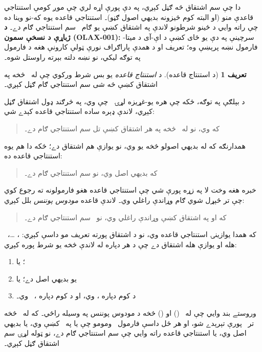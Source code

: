 \documentclass[12pt,a4paper,oneside]{report}
\theoremstyle{definition}
\newtheorem{defn}[thm]{تعريف}
\begin{document}
\label{olpseg:OLP-0113-B008:start}
دا چې سم اشتقاق څه ګڼل کېږي، په دې پورې اړه لري چې موږ
کومې استنتاجي قاعدې منو (او البته کوم څيزونه بديهي اصول ګڼو)۔
استنتاجي قاعده يوه که-نو وينا ده چې راته وايي د ځينو شرطونو لاندې
په اشتقاق کښې يو ګام~ سم استنتاجي ګام دے۔
\textbf{د ژباړې د نسخې سمون (OLAX-001):} سرچينې په دې يو ځای کښې
د اې-آی د ميتا-فارمول نښه پرېښې وه؛ تعريف او د همدې پاراګراف نورې
ټولې کارونې هغه د فارمول په توګه ليکي، نو نښه دلته بېرته راوستل شوه۔
\label{olpseg:OLP-0113-B008:end}

\label{olpseg:OLP-0113-B009:start}
\begin{defn}[د استنتاج قاعده]
د \emph{استنتاج قاعده} يو بس شرط ورکوي چې له~\LR{$\Gamma$} څخه په
اشتقاق کښې څه شی سم استنتاجي ګام ګڼل کېږي۔
\end{defn}
\label{olpseg:OLP-0113-B009:end}

\label{olpseg:OLP-0113-B010:start}
د بېلګې په توګه، ځکه چې هره يو-غړيزه لړۍ~ چې
 وي، په څرګند ډول اشتقاق ګڼل کېږي، لاندې
ډېره ساده استنتاجي قاعده کېدے شي:
\begin{quote}
  که  وي، نو  له~\LR{$\Gamma$} څخه په هر
  اشتقاق کښې تل سم استنتاجي ګام دے۔
\end{quote}
همدارنګه که  له بديهي اصولو څخه يو وي، نو يوازې  هم
اشتقاق دے؛ ځکه دا هم يوه استنتاجي قاعده ده:
\begin{quote}
  که  بديهي اصل وي، نو  سم استنتاجي ګام دے۔
\end{quote}
خبره هغه وخت لا په زړه پورې شي چې استنتاجي قاعده هغو فارمولونه
ته رجوع کوي چې تر څېړل شوي ګام وړاندې راغلي وي۔ لاندې قاعده
\emph{مودوس پوننس} بلل کېږي:
\begin{quote}
  که  او  په اشتقاق کښې وړاندې راغلي وي،
  نو~ سم استنتاجي ګام دے۔
\end{quote}
که همدا يوازينۍ استنتاجي قاعده وي، نو د اشتقاق پورته تعريف
مو داسې کېږي: ، \dots،~ هله او يوازې هله
اشتقاق دے چې د هر  دپاره له لاندې څخه يو شرط
پوره کېږي:
\begin{enumerate}
\item {}؛ يا
\item {} يو بديهي اصل دے؛ يا
\item د کوم  دپاره ،  وي، او د کوم
   دپاره ،~ وي۔
\end{enumerate}
وروستے بند وايي چې  له~ () او
 () څخه د مودوس پوننس په وسيله راځي۔ که له~ څخه
تر~ پورې تېرېدے شو، او هر ځل داسې فارمول~ ومومو
چې يا په~\LR{$\Gamma$} کښې وي، يا بديهي اصل وي، يا استنتاجي قاعده راته
وايي چې سم استنتاجي ګام دے، نو ټوله لړۍ سم اشتقاق ګڼل کېږي۔
\label{olpseg:OLP-0113-B010:end}
\end{document}
